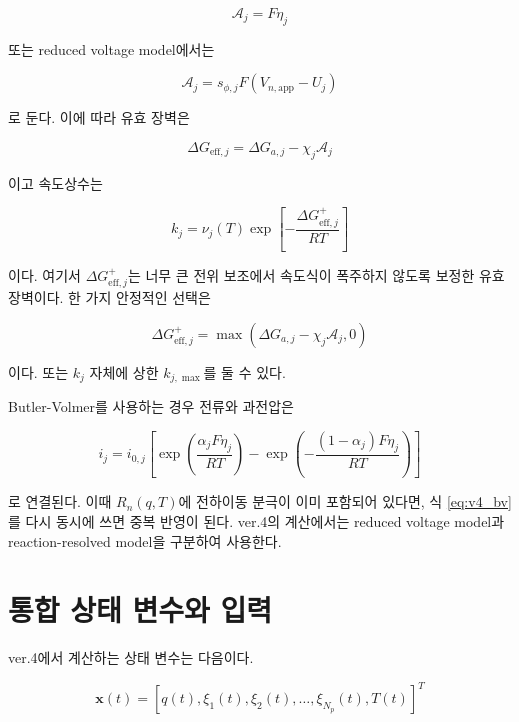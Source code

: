 \documentclass[11pt,a4paper]{article}
\newcommand{\app}{\mathrm{app}}
\newcommand{\eff}{\mathrm{eff}}
\begin{document}
\begin{equation}
\mathcal A_j=F\eta_j
\label{eq:v4_A_eta}
\end{equation}

또는 reduced voltage model에서는

\begin{equation}
\mathcal A_j=s_{\phi,j}F(V_{n,\app}-U_j)
\label{eq:v4_A_vapp}
\end{equation}

로 둔다. 이에 따라 유효 장벽은

\begin{equation}
\Delta G_{\eff,j}=\Delta G_{a,j}-\chi_j\mathcal A_j
\label{eq:v4_Geff}
\end{equation}

이고 속도상수는

\begin{equation}
k_j=\nu_j(T)\exp\left[-\frac{\Delta G_{\eff,j}^{+}}{RT}\right]
\label{eq:v4_k_reduced}
\end{equation}

이다. 여기서 \(\Delta G_{\eff,j}^{+}\)는 너무 큰 전위 보조에서 속도식이 폭주하지 않도록 보정한 유효 장벽이다. 한 가지 안정적인 선택은

\begin{equation}
\Delta G_{\eff,j}^{+}=\max\left(\Delta G_{a,j}-\chi_j\mathcal A_j,0\right)
\label{eq:v4_Geff_plus}
\end{equation}

이다. 또는 \(k_j\) 자체에 상한 \(k_{j,\max}\)를 둘 수 있다.

Butler-Volmer를 사용하는 경우 전류와 과전압은

\begin{equation}
i_j=i_{0,j}\left[\exp\left(\frac{\alpha_jF\eta_j}{RT}\right)-\exp\left(-\frac{(1-\alpha_j)F\eta_j}{RT}\right)\right]
\label{eq:v4_bv}
\end{equation}

로 연결된다. 이때 \(R_n(q,T)\)에 전하이동 분극이 이미 포함되어 있다면, 식 \eqref{eq:v4_bv}를 다시 동시에 쓰면 중복 반영이 된다. ver.4의 계산에서는 reduced voltage model과 reaction-resolved model을 구분하여 사용한다.

\section{통합 상태 변수와 입력}
ver.4에서 계산하는 상태 변수는 다음이다.

\begin{equation}
\mathbf x(t)=\left[q(t),\xi_1(t),\xi_2(t),\ldots,\xi_{N_p}(t),T(t)\right]^T
\label{eq:v4_state_vector}
\end{equation}
\end{document}

